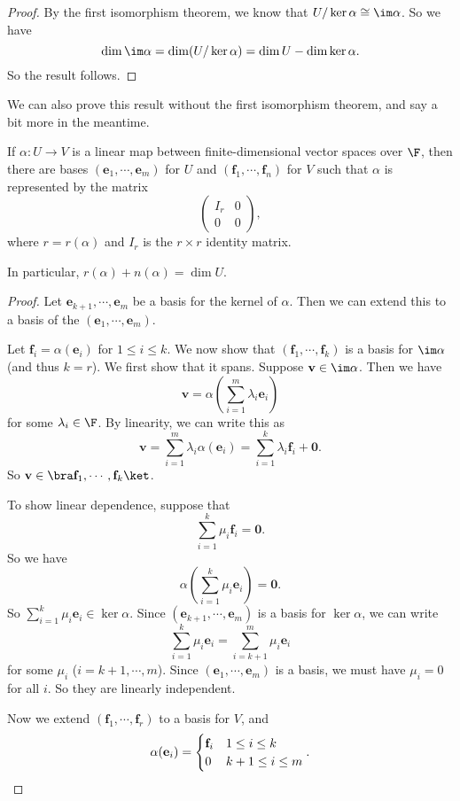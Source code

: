 \documentclass[a4paper]{article}
\begin{document}
\begin{proof}
  By the first isomorphism theorem, we know that $U/\ker \alpha \cong \im \alpha$. So we have
  \[
    \dim \im \alpha = \dim (U/\ker \alpha) = \dim U - \dim \ker \alpha.
  \]
  So the result follows.
\end{proof}

We can also prove this result without the first isomorphism theorem, and say a bit more in the meantime.
\begin{prop}
  If $\alpha: U\to V$ is a linear map between finite-dimensional vector spaces over $\F$, then there are bases $(\mathbf{e}_1, \cdots, \mathbf{e}_m)$ for $U$ and $(\mathbf{f}_1, \cdots, \mathbf{f}_n)$ for $V$ such that $\alpha$ is represented by the matrix
  \[
    \begin{pmatrix}
      I_r & 0\\
      0 & 0
    \end{pmatrix},
  \]
  where $r = r(\alpha)$ and $I_r$ is the $r\times r$ identity matrix.

  In particular, $r(\alpha) + n(\alpha) = \dim U$.
\end{prop}

\begin{proof}
  Let $\mathbf{e}_{k + 1}, \cdots, \mathbf{e}_m$ be a basis for the kernel of $\alpha$. Then we can extend this to a basis of the $(\mathbf{e}_1,\cdots, \mathbf{e}_m)$.

  Let $\mathbf{f}_i = \alpha(\mathbf{e}_i)$ for $1 \leq i \leq k$. We now show that $(\mathbf{f}_1, \cdots, \mathbf{f}_k)$ is a basis for $\im \alpha$ (and thus $k = r$). We first show that it spans. Suppose $\mathbf{v}\in \im \alpha$. Then we have
  \[
    \mathbf{v} = \alpha\left(\sum_{i = 1}^m \lambda_i \mathbf{e}_i\right)
  \]
  for some $\lambda_i \in \F$. By linearity, we can write this as
  \[
    \mathbf{v} = \sum_{i = 1}^m \lambda_i \alpha(\mathbf{e}_i) = \sum_{i = 1}^k \lambda_i \mathbf{f}_i + \mathbf{0}.
  \]
  So $\mathbf{v}\in \bra \mathbf{f}_1, \cdots, \mathbf{f}_k\ket$.

  To show linear dependence, suppose that
  \[
    \sum_{i = 1}^k \mu_i \mathbf{f}_i = \mathbf{0}.
  \]
  So we have
  \[
    \alpha \left(\sum_{i = 1}^k \mu_i \mathbf{e}_i\right) = \mathbf{0}.
  \]
  So $\sum_{i = 1}^k \mu_i \mathbf{e}_i \in \ker \alpha$. Since $(\mathbf{e}_{k + 1}, \cdots, \mathbf{e}_m)$ is a basis for $\ker \alpha$, we can write
  \[
    \sum_{i = 1}^k \mu_i \mathbf{e}_i = \sum_{i = k + 1}^m \mu_i \mathbf{e}_i
  \]
  for some $\mu_i$ ($i = k + 1, \cdots, m$). Since $(\mathbf{e}_1, \cdots, \mathbf{e}_m)$ is a basis, we must have $\mu_i = 0$ for all $i$. So they are linearly independent.

  Now we extend $(\mathbf{f}_1, \cdots, \mathbf{f}_r)$ to a basis for $V$, and
  \[
    \alpha(\mathbf{e}_i) =
    \begin{cases}
      \mathbf{f}_i & 1 \leq i \leq k\\
      0 & k + 1 \leq i \leq m
    \end{cases}.\qedhere
  \]
\end{proof}
\end{document}
